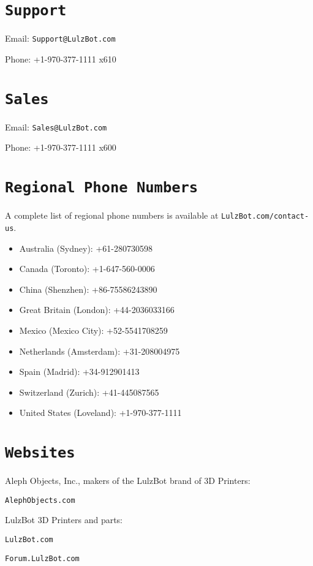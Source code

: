 %
%
%
%
%

\section{\texttt{Support}}
\setlength{\parindent}{0pt}
Email: \texttt{Support@LulzBot.com}

Phone: +1-970-377-1111 x610

\section{\texttt{Sales}}

Email: \texttt{Sales@LulzBot.com}

Phone: +1-970-377-1111 x600

\section{\texttt{Regional Phone Numbers}}\label{regional-phone-numbers}
A complete list of regional phone numbers is available at \texttt{LulzBot.com/contact-us}. 
\begin{itemize}
\item Australia﻿ (Sydney﻿): +61-280730598
\item Canada (Toronto): +1-647-560-0006
\item China (Shenzhen): +86-75586243890
\item Great Britain (London﻿)﻿: +44-2036033166﻿
\item Mexico (Mexico City﻿)﻿: +52-5541708259
\item Netherlands (Amsterdam﻿)﻿: +31-208004975
\item Spain﻿ (Madrid﻿): +34-912901413﻿
\item Switzerland﻿ (Zurich﻿)﻿: +41-445087565
\item United States (Loveland): +1-970-377-1111
\end{itemize}

\section{\texttt{Websites}}

Aleph Objects, Inc., makers of the LulzBot brand of 3D Printers:

\texttt{AlephObjects.com}


LulzBot 3D Printers and parts:

\texttt{LulzBot.com}

\texttt{Forum.LulzBot.com}
